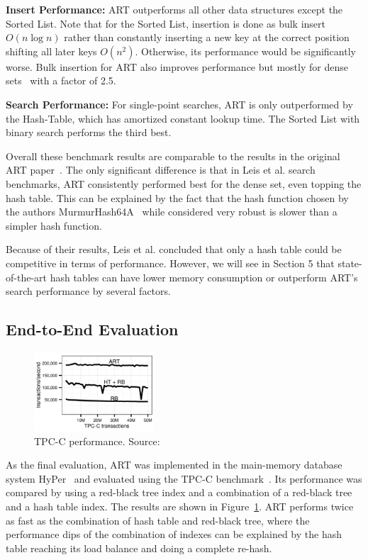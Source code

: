 \documentclass[acmtog, nonacm]{acmart}
\begin{document}
\textbf{Insert Performance:} ART outperforms all other data structures except the Sorted List. 
Note that for the Sorted List, insertion is done as bulk insert $O(n\log n)$ rather than constantly 
inserting a new key at the correct position shifting all later keys $O(n^2)$. Otherwise, its performance would be significantly
worse. Bulk insertion for ART also improves performance but mostly for dense sets~\cite{6544812} with a factor of 2.5.

\textbf{Search Performance:} For single-point searches, ART is only outperformed by the Hash-Table, which has amortized
constant lookup time. The Sorted List with binary search performs the third best.

Overall these benchmark results are comparable to the results in the original ART paper~\cite{6544812}. 
The only significant difference is that in Leis et al. search benchmarks, ART consistently performed best for the 
dense set, even topping the hash table. This can be explained by the fact that the hash function chosen by the authors 
MurmurHash64A~\cite{murmur} while considered very robust is slower than a simpler hash function.

Because of their results, Leis et al. concluded that only a hash table could be competitive in terms
of performance. However, we will see in Section 5 that state-of-the-art hash tables can have lower memory consumption
or outperform ART's search performance by several factors.

\subsection{End-to-End Evaluation}

\begin{figure}
    \centering
    \includegraphics[width=0.4\textwidth]{images/07-art-tpc-c.png}
    \caption{TPC-C performance.
    Source:~\cite{6544812}}
    \label{fig:art-tpc-c}
\end{figure}

As the final evaluation, ART was implemented in the main-memory database system HyPer~\cite{5767867} and evaluated 
using the TPC-C benchmark~\cite{6544812}. Its performance was compared by using a red-black tree index and a 
combination of a red-black tree and a hash table index. The results are shown in Figure~\ref{fig:art-tpc-c}. ART 
performs twice as fast as the combination of hash table and red-black tree, where the performance dips of the combination of indexes can be 
explained by the hash table reaching its load balance and doing a complete re-hash.
\end{document}

